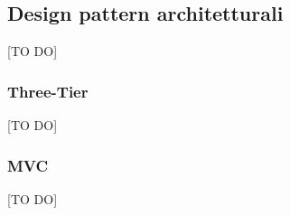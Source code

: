 %
%


\subsection{Design pattern architetturali} %
\label{sub:design_pattern_architetturali}
[TO DO]
	\subsubsection{Three-Tier} %
	\label{ssub:three_tier}
	[TO DO]

	\subsubsection{MVC} %
	\label{ssub:mvc}
	[TO DO]
